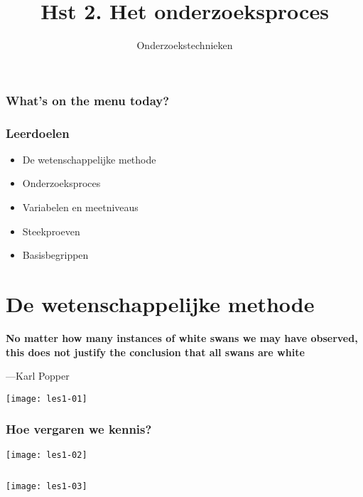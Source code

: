 \documentclass[aspectratio=169]{beamer}
\title{Hst 2. Het onderzoeksproces}
\subtitle{Onderzoekstechnieken}
\begin{document}
\begin{frame}
  \maketitle
\end{frame}

\begin{frame}
  \frametitle{What's on the menu today?}
  
  \tableofcontents
\end{frame}

\begin{frame}
  \frametitle{Leerdoelen}
  
  \begin{itemize}
    \item De wetenschappelijke methode
    \item Onderzoeksproces
    \item Variabelen en meetniveaus
    \item Steekproeven
    \item Basisbegrippen
  \end{itemize}
\end{frame}

\section{De wetenschappelijke methode}


\begin{frame}[plain]
  \bfseries\Large
  No matter how many instances of white swans we may have observed, this does not justify the conclusion that all swans are white
  
  \bigskip
  
  ---Karl Popper
\end{frame}

\begin{frame}[plain]
  \centering
  \texttt{[image: les1-01]}
\end{frame}

\begin{frame}
  \frametitle{Hoe vergaren we kennis?}
  
  \centering
  \texttt{[image: les1-02]}
\end{frame}

\begin{frame}[plain,c]
  \begin{columns}
    \column{\dimexpr\paperwidth}
    \texttt{[image: les1-03]}
  \end{columns}
\end{frame}
\end{document}
